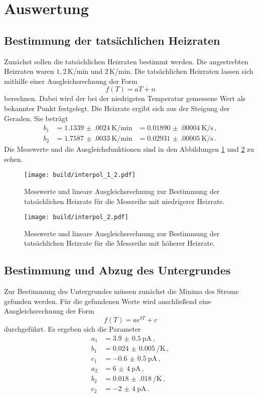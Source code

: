 \section{Auswertung}
\label{sec:Auswertung}

\subsection{Bestimmung der tatsächlichen Heizraten}
Zunächst sollen die tatsächlichen Heizraten bestimmt werden. Die angestrebten
Heizraten waren $1{,}2\,$K/min und 2\,K/min. Die tatsächlichen Heizraten lassen
sich mithilfe einer Ausgleichsrechnung der Form
\begin{equation*}
  f(T)=aT+n
\end{equation*}
berechnen. Dabei wird der bei der niedrigsten Temperatur gemessene Wert als bekannter
Punkt festgelegt. Die Heizrate ergibt sich aus der Steigung der Geraden. Sie beträgt
\begin{align*}
  b_1&=\SI{1.1339(0024)}{\kelvin\per\minute}&= \SI{0.01890(00004)}{\kelvin\per\second}\,, \\
  b_2&=\SI{1.7587(0033)}{\kelvin\per\minute}&= \SI{0.02931(00005)}{\kelvin\per\second}\,.
\end{align*}
Die Messwerte und die Ausgleichsfunktionen sind in den Abbildungen \ref{fig:heiz1}
und \ref{fig:heiz2} zu sehen.

\begin{figure}
  \centering
  \texttt{[image: build/interpol\_1\_2.pdf]}
  \caption{Messwerte und lineare Ausgleichsrechnung zur Bestimmung der tatsächlichen
  Heizrate für die Messreihe mit niedrigerer Heizrate.}
  \label{fig:heiz1}
\end{figure}
\begin{figure}
  \centering
  \texttt{[image: build/interpol\_2.pdf]}
  \caption{Messwerte und lineare Ausgleichsrechnung zur Bestimmung der tatsächlichen
  Heizrate für die Messreihe mit höherer Heizrate.}
  \label{fig:heiz2}
\end{figure}


\subsection{Bestimmung und Abzug des Untergrundes}

Zur Bestimmung des Untergrundes müssen zunächst die Minima des Stroms gefunden
werden. Für die gefundenen Werte wird anschließend eine Ausgleichsrechnung der
Form
\begin{equation*}
  f(T)=a e^{bT} +c
\end{equation*}
durchgeführt. Es ergeben sich die Parameter
\begin{align*}
  a_1&=\SI{3.9(05)}{\pico\ampere}  \,,\\
  b_1&=\SI{0.024(0005)}{\per\kelvin}  \,,\\
  c_1&=\SI{-0.6(05)}{\pico\ampere}  \,,\\
  a_2&=\SI{6(4)}{\pico\ampere}  \,,\\
  b_2&=\SI{0.018(018)}{\per\kelvin}  \,,\\
  c_2&=\SI{-2(4)}{\pico\ampere}  \,.
\end{align*}

